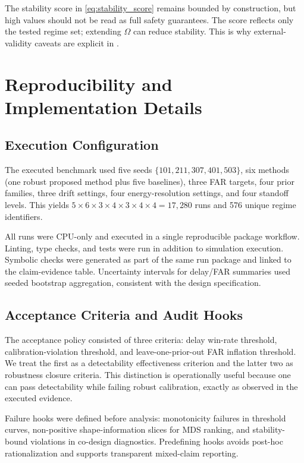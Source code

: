 \documentclass{article} %
\begin{document}
The stability score in \eqref{eq:stability_score} remains bounded by construction, but high values should not be read as full safety guarantees. The score reflects only the tested regime set; extending $\Omega$ can reduce stability. This is why external-validity caveats are explicit in .

\section{Reproducibility and Implementation Details}\label{sec:appendix_reproducibility}
\subsection{Execution Configuration}
The executed benchmark used five seeds $\{101,211,307,401,503\}$, six methods (one robust proposed method plus five baselines), three FAR targets, four prior families, three drift settings, four energy-resolution settings, and four standoff levels. This yields $5\times 6\times 3\times 4\times 3\times 4\times 4=17{,}280$ runs and 576 unique regime identifiers.

All runs were CPU-only and executed in a single reproducible package workflow. Linting, type checks, and tests were run in addition to simulation execution. Symbolic checks were generated as part of the same run package and linked to the claim-evidence table. Uncertainty intervals for delay/FAR summaries used seeded bootstrap aggregation, consistent with the design specification.

\subsection{Acceptance Criteria and Audit Hooks}
The acceptance policy consisted of three criteria: delay win-rate threshold, calibration-violation threshold, and leave-one-prior-out FAR inflation threshold. We treat the first as a detectability effectiveness criterion and the latter two as robustness closure criteria. This distinction is operationally useful because one can pass detectability while failing robust calibration, exactly as observed in the executed evidence.

Failure hooks were defined before analysis: monotonicity failures in threshold curves, non-positive shape-information slices for MDS ranking, and stability-bound violations in co-design diagnostics. Predefining hooks avoids post-hoc rationalization and supports transparent mixed-claim reporting.
\end{document}
